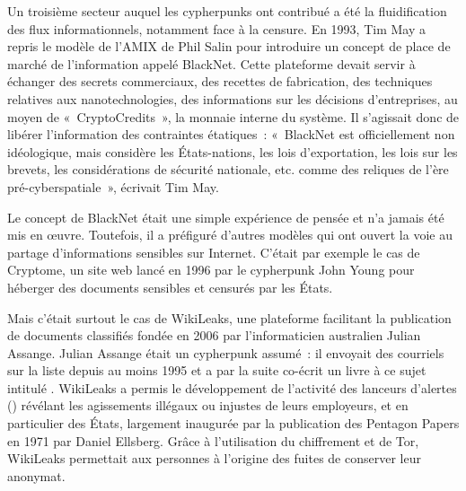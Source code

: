 Un troisième secteur auquel les cypherpunks ont contribué a été la fluidification des flux informationnels, notamment face à la censure. En 1993, Tim May a repris le modèle de l'AMIX de Phil Salin pour introduire un concept de place de marché de l'information appelé BlackNet. Cette plateforme devait servir à échanger des secrets commerciaux, des recettes de fabrication, des techniques relatives aux nanotechnologies, des informations sur les décisions d'entreprises, au moyen de «~CryptoCredits~», la monnaie interne du système. Il s'agissait donc de libérer l'information des contraintes étatiques~: «~BlackNet est officiellement non idéologique, mais considère les États-nations, les lois d'exportation, les lois sur les brevets, les considérations de sécurité nationale, etc. comme des reliques de l'ère pré-cyberspatiale~», écrivait Tim May.

Le concept de BlackNet était une simple expérience de pensée et n'a jamais été mis en œuvre. Toutefois, il a préfiguré d'autres modèles qui ont ouvert la voie au partage d'informations sensibles sur Internet. C'était par exemple le cas de Cryptome, un site web lancé en 1996 par le cypherpunk John Young pour héberger des documents sensibles et censurés par les États.

Mais c'était surtout le cas de WikiLeaks, une plateforme facilitant la publication de documents classifiés fondée en 2006 par l'informaticien australien Julian Assange. Julian Assange était un cypherpunk assumé~: il envoyait des courriels sur la liste depuis au moins 1995 et a par la suite co-écrit un livre à ce sujet intitulé . WikiLeaks a permis le développement de l'activité des lanceurs d'alertes () révélant les agissements illégaux ou injustes de leurs employeurs, et en particulier des États, largement inaugurée par la publication des Pentagon Papers en 1971 par Daniel Ellsberg. Grâce à l'utilisation du chiffrement et de Tor, WikiLeaks permettait aux personnes à l'origine des fuites de conserver leur anonymat.

